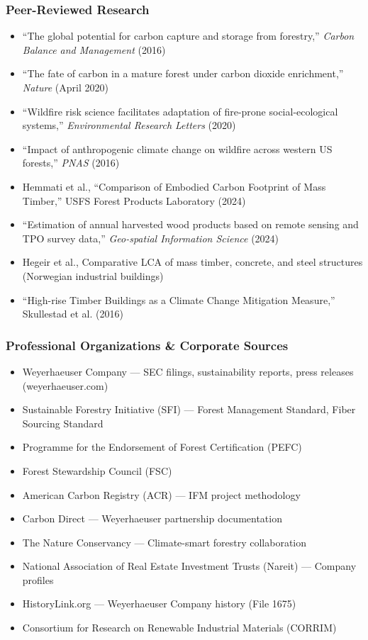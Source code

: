 \documentclass[11pt,letterpaper]{article}
\begin{document}
\subsubsection{Peer-Reviewed Research}

\begin{itemize}[leftmargin=2em]
\item ``The global potential for carbon capture and storage from forestry,'' \textit{Carbon Balance and Management} (2016)
\item ``The fate of carbon in a mature forest under carbon dioxide enrichment,'' \textit{Nature} (April 2020)
\item ``Wildfire risk science facilitates adaptation of fire-prone social-ecological systems,'' \textit{Environmental Research Letters} (2020)
\item ``Impact of anthropogenic climate change on wildfire across western US forests,'' \textit{PNAS} (2016)
\item Hemmati et al., ``Comparison of Embodied Carbon Footprint of Mass Timber,'' USFS Forest Products Laboratory (2024)
\item ``Estimation of annual harvested wood products based on remote sensing and TPO survey data,'' \textit{Geo-spatial Information Science} (2024)
\item Hegeir et al., Comparative LCA of mass timber, concrete, and steel structures (Norwegian industrial buildings)
\item ``High-rise Timber Buildings as a Climate Change Mitigation Measure,'' Skullestad et al. (2016)
\end{itemize}

\subsubsection{Professional Organizations \& Corporate Sources}

\begin{itemize}[leftmargin=2em]
\item Weyerhaeuser Company --- SEC filings, sustainability reports, press releases (weyerhaeuser.com)
\item Sustainable Forestry Initiative (SFI) --- Forest Management Standard, Fiber Sourcing Standard
\item Programme for the Endorsement of Forest Certification (PEFC)
\item Forest Stewardship Council (FSC)
\item American Carbon Registry (ACR) --- IFM project methodology
\item Carbon Direct --- Weyerhaeuser partnership documentation
\item The Nature Conservancy --- Climate-smart forestry collaboration
\item National Association of Real Estate Investment Trusts (Nareit) --- Company profiles
\item HistoryLink.org --- Weyerhaeuser Company history (File 1675)
\item Consortium for Research on Renewable Industrial Materials (CORRIM)
\end{itemize}
\end{document}
